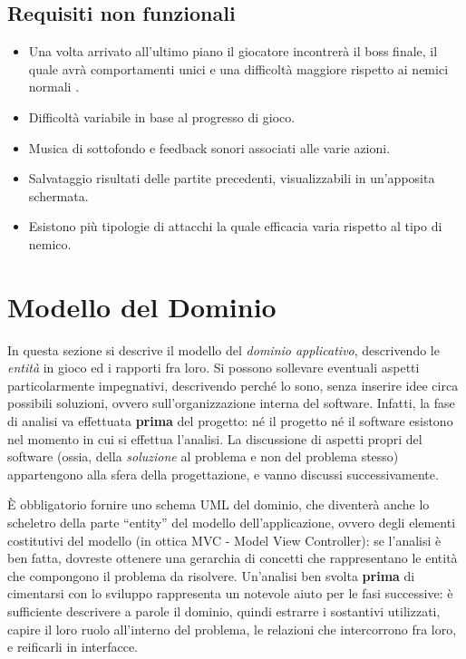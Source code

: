 \documentclass[a4paper,12pt]{report}
\begin{document}
\subsection*{Requisiti non funzionali}
\begin{itemize}
	\item Una volta arrivato all'ultimo piano il giocatore incontrerà il boss finale, il quale avrà comportamenti  unici e una difficoltà maggiore rispetto ai nemici normali .
	\item Difficoltà variabile in base al progresso di gioco.
	\item Musica di sottofondo e feedback sonori associati alle varie azioni.
	\item Salvataggio risultati delle partite precedenti, visualizzabili in un'apposita schermata.
	\item Esistono più tipologie di attacchi la quale efficacia varia rispetto al tipo di nemico.
\end{itemize}

\section{Modello del Dominio}

In questa sezione si descrive il modello del \textit{dominio
applicativo}, descrivendo le \textit{entità} in gioco ed i rapporti fra loro.
%
Si possono sollevare eventuali aspetti particolarmente impegnativi, descrivendo perché lo sono, senza inserire idee circa possibili soluzioni, ovvero sull'organizzazione interna del software.
%
Infatti, la fase di analisi va effettuata \textbf{prima} del progetto: né il progetto né il software esistono nel momento in cui si effettua l'analisi.
%
La discussione di aspetti propri del software (ossia, della \textit{soluzione} al problema e non del problema stesso) appartengono alla sfera della progettazione, e vanno discussi successivamente.

È obbligatorio fornire uno schema UML del dominio, che diventerà anche lo scheletro della
parte ``entity'' del modello dell'applicazione, ovvero degli elementi costitutivi del modello (in ottica MVC - Model View Controller): se l'analisi è ben fatta, dovreste ottenere una gerarchia di concetti che rappresentano le entità che compongono il problema da risolvere.
%
Un'analisi ben svolta \textbf{prima} di cimentarsi con lo sviluppo rappresenta un notevole aiuto per
le fasi successive: è sufficiente descrivere a parole il dominio, quindi estrarre i sostantivi
utilizzati, capire il loro ruolo all'interno del problema, le relazioni che intercorrono fra loro, e
reificarli in interfacce.
\end{document}
